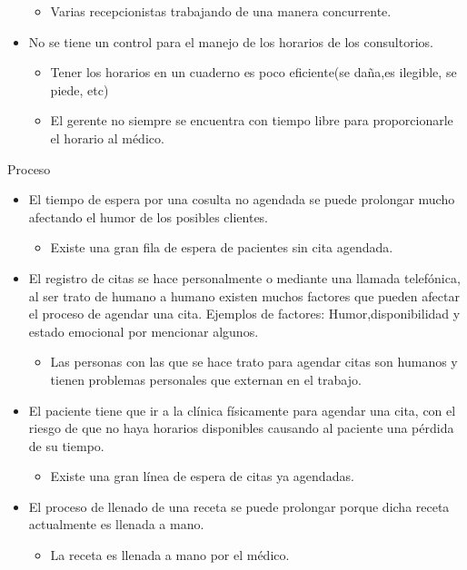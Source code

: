 \begin{itemize}
	\begin{itemize}
		\item Varias recepcionistas trabajando de una manera concurrente.
	\end{itemize}
    
    \item No se tiene un control para el manejo de los horarios de los consultorios.
	\begin{itemize}
		\item Tener los horarios en un cuaderno es poco eficiente(se daña,es ilegible, se piede, etc)
        \item El gerente no siempre se encuentra con tiempo libre para proporcionarle el horario al médico.
	\end{itemize}
\end{itemize}

Proceso
\begin{itemize}
	 \item El tiempo de espera por una cosulta no agendada se puede prolongar mucho afectando el humor de los posibles clientes.
	\begin{itemize}
		\item Existe una gran fila de espera de pacientes sin cita agendada.
	\end{itemize}
    
     \item El registro de citas se hace personalmente o mediante una llamada telefónica, al ser trato de humano a humano existen muchos factores que pueden afectar el proceso de agendar una cita. Ejemplos de factores: Humor,disponibilidad y estado emocional por mencionar algunos.
	\begin{itemize}
		\item Las personas con las que se hace trato para agendar citas son humanos y tienen problemas personales que externan en el trabajo.  
	\end{itemize}
 
     \item El paciente tiene que ir a la clínica físicamente para agendar una cita, con el riesgo de que no haya horarios disponibles causando al paciente una pérdida de su tiempo.

	\begin{itemize}
		\item Existe una gran línea de espera de citas ya agendadas. 
	\end{itemize}
    
    
     \item El proceso de llenado de una receta se puede prolongar porque dicha receta actualmente es llenada a mano.


	\begin{itemize}
		\item La receta es llenada a mano por el médico.
	\end{itemize}
\end{itemize}

